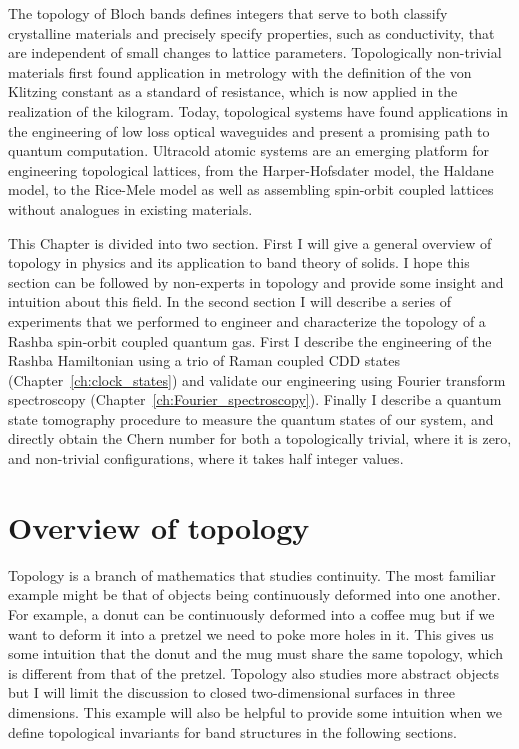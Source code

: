  The topology of Bloch bands defines integers that serve to both classify crystalline materials and precisely specify properties, such as conductivity, that are independent of small changes to lattice parameters\cite{hasan_colloquium:_2010}. Topologically non-trivial materials first found application in metrology with the definition of the von Klitzing constant as a standard of resistance, which is now applied in the realization of the kilogram\cite{newell_codata_2018}. Today, topological systems have found applications in the engineering of low loss optical waveguides\cite{ozawa_topological_2019} and present a promising path to quantum computation\cite{nayak_non-abelian_2008}. Ultracold atomic systems are an emerging platform for engineering topological lattices, from the Harper-Hofsdater model\cite{miyake_realizing_2013,aidelsburger_realization_2013}, the Haldane model\cite{jotzu_experimental_2014}, to the Rice-Mele model\cite{lu_geometrical_2016,lohse_thouless_2016} as well as assembling spin-orbit coupled lattices without analogues in existing materials\cite{wu_realization_2016,sun_highly_2018}.


This Chapter is divided into two section. First I will give a general overview of topology in physics and its application to band theory of solids. I hope this section can be followed by non-experts in topology and provide some insight and intuition about this field. In the second section I will describe a series of experiments that we performed to engineer and characterize the topology of a Rashba spin-orbit coupled quantum gas. First I describe the engineering of the Rashba Hamiltonian using a trio of Raman coupled CDD states (Chapter~\ref{ch:clock_states}) and validate our engineering using Fourier transform spectroscopy (Chapter~\ref{ch:Fourier_spectroscopy}). Finally I describe a quantum state tomography procedure to measure the quantum states of our system, and directly obtain the Chern number for both a topologically trivial, where it is zero, and non-trivial configurations, where it takes half integer values. 

\label{ch:Rashba}

\section{Overview of topology} 

Topology is a branch of mathematics that studies continuity. The most familiar example might be that of objects being continuously deformed into one another. For example, a donut can be continuously deformed into a coffee mug but if we want to deform it into a pretzel we need to poke more holes in it. This gives us some intuition that the donut and the mug must share the same topology, which is different from that of the pretzel. Topology also studies more abstract objects but I will limit the discussion to closed two-dimensional surfaces in three dimensions. This example will also be helpful to provide some intuition when we define topological invariants for band structures in the following sections.  

